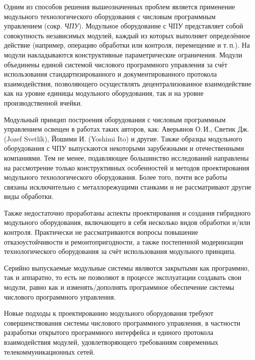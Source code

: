 Одним из способов решения вышеозначенных проблем является применение модульного технологического оборудования с числовым программным управлением (сокр. \textit{ЧПУ}). Модульное оборудование с ЧПУ представляет собой совокупность независимых модулей, каждый из которых выполняет определённое действие (например, операцию обработки или контроля, перемещение и т.\,п.). На модули накладываются конструктивные параметрические ограничения. Модули объединены единой системой числового программного управления за счёт использования стандартизированного и документированного протокола взаимодействия, позволяющего осуществлять децентрализованное взаимодействие как на уровне единицы модульного оборудования, так и на уровне производственной ячейки. 

Модульный принцип построения оборудования с числовым программным управлением освещен в работах таких авторов, как: Аверьянов О.\,И., Светик Дж. (Jozef Svetl\'ik), Йошими И. (Yoshimi Ito) и другие. Также образцы модульного оборудования с ЧПУ выпускаются некоторыми зарубежными и отечественными компаниями. Тем не менее, подавляющее большинство исследований направлены на рассмотрение только конструктивных особенностей и методов проектирования модульного технологического оборудования. Более того, почти все работы связаны исключительно с металлорежущими станками и не рассматривают другие виды обработки.

Также недостаточно проработаны аспекты проектирования и создания гибридного модульного оборудования, включающего в себя несколько видов обработки и/или контроля. Практически не рассматриваются вопросы повышение отказоустойчивости и ремонтопригодности, а также постепенной модернизации технологического оборудования за счёт использования модульного принципа.

Серийно выпускаемые модульные системы являются закрытыми как программно, так и аппаратно, то есть не позволяют в процессе эксплуатации создавать свои модули, равно как и изменять/дополнять программное обеспечение системы числового программного управления. 

Новые подходы к проектированию модульного оборудования требуют совершенствования системы числового программного управления, в частности разработки открытого программного интерфейса и единого протокола взаимодействия модулей, удовлетворяющего требованиям современных телекоммуникационных сетей.

